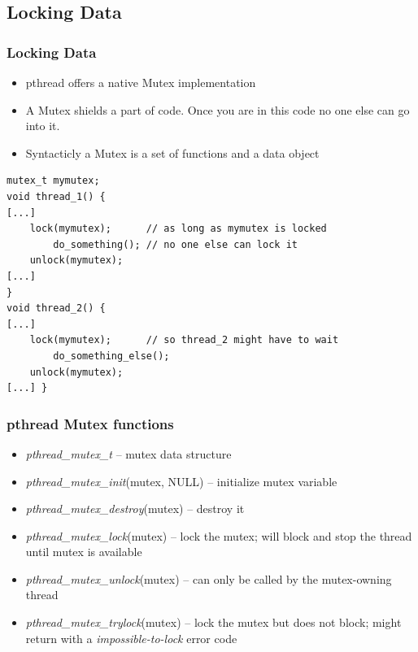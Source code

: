 \documentclass[10pt]{beamer}
\begin{document}
\subsection{Locking Data}

\begin{frame}[fragile]
    \frametitle{Locking Data}
    \begin{itemize}
        \item pthread offers a native Mutex implementation
        \item A Mutex shields a part of code. Once you are in this code no one else can go into it.
        \item Syntacticly a Mutex is a set of functions and a data object
    \end{itemize}

\begin{block}{}
\begin{lstlisting}
mutex_t mymutex;
void thread_1() {
[...]
    lock(mymutex);      // as long as mymutex is locked
        do_something(); // no one else can lock it
    unlock(mymutex);
[...]
}
void thread_2() {
[...]
    lock(mymutex);      // so thread_2 might have to wait
        do_something_else();
    unlock(mymutex);
[...] }
\end{lstlisting}
\end{block}
\end{frame}


\begin{frame}
    \frametitle{pthread Mutex functions}
    \begin{itemize}
\item {\it pthread\_mutex\_t} -- mutex data structure
\item {\it pthread\_mutex\_init}(mutex, NULL) -- initialize mutex variable
\item {\it pthread\_mutex\_destroy}(mutex) -- destroy it
\item {\it pthread\_mutex\_lock}(mutex) -- lock the mutex; will block and stop the thread until mutex is available
\item {\it pthread\_mutex\_unlock}(mutex) -- can only be called by the mutex-owning thread
\item {\it pthread\_mutex\_trylock}(mutex) -- lock the mutex but does not block; might return with a \emph{impossible-to-lock} error code
    \end{itemize}
\end{frame}
\end{document}
